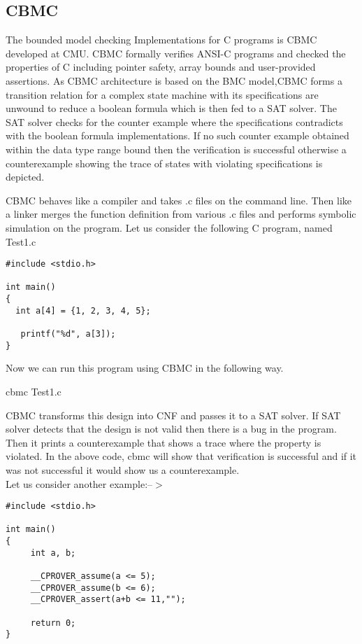 \subsection{CBMC}
 
The bounded model checking Implementations for C programs is CBMC developed 
at CMU. CBMC formally verifies ANSI-C programs and checked the properties of 
C including pointer safety, array bounds and user-provided assertions. As CBMC 
architecture is based on the BMC model,CBMC forms a transition relation for a
complex state  machine  with its specifications are unwound to reduce a boolean
formula which is then fed to a SAT solver. The SAT solver checks for the counter
example where the specifications contradicts with the boolean formula 
implementations. If no such counter example obtained within the data type range 
bound then the  verification  is successful otherwise a counterexample showing 
the trace of  states with violating specifications is depicted.
 
 
CBMC behaves like a compiler and takes .c files on the command line. Then like a 
linker merges the function definition from various .c files and performs symbolic 
simulation on the program.
Let us consider the following C program, named Test1.c
\begin{verbatim}
#include <stdio.h>
 
int main()
{
  int a[4] = {1, 2, 3, 4, 5};
  
   printf("%d", a[3]);
}
\end{verbatim}

Now we can run this program using CBMC in the following way.

cbmc Test1.c

CBMC transforms this design into CNF and passes it to a SAT solver.
If SAT solver detects that the design is not valid then there is a bug in the 
program. Then it prints a counterexample that shows a trace where the property 
is violated. In the above code, cbmc will show that verification is successful
and if it was not successful it would show us a counterexample.\\
 
Let us consider another example:--$>$
\begin{verbatim}
#include <stdio.h>
  
int main()
{
     int a, b;

     __CPROVER_assume(a <= 5);
     __CPROVER_assume(b <= 6);
     __CPROVER_assert(a+b <= 11,"");

     return 0;
}

\end{verbatim}

